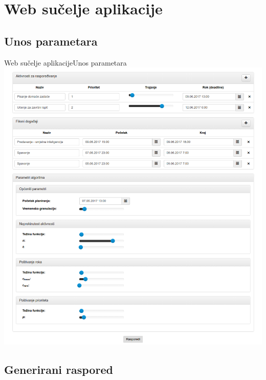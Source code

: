 \documentclass{beamer}
\begin{document}
\section{Web sučelje aplikacije}

\subsection{Unos parametara}

\begin{frame}{Web sučelje aplikacije}{Unos parametara}
\centering
\includegraphics[totalheight=0.8\textheight]{../TeX/resources/graphics/screenshot-form.png}
\end{frame}

\subsection{Generirani raspored}
\end{document}
